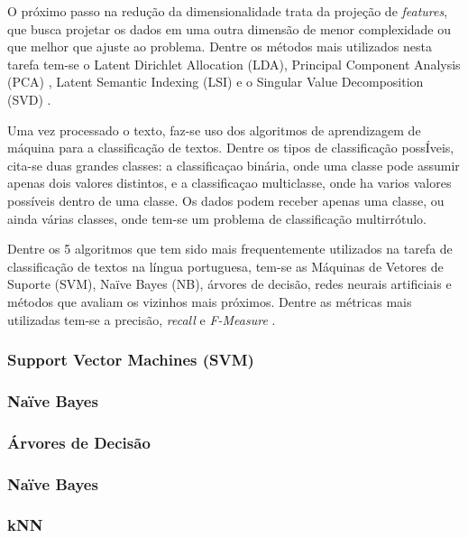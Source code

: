 

O próximo passo na redução da dimensionalidade trata da projeção de \textit{features}, que busca projetar os dados em uma outra dimensão de menor complexidade ou que melhor que ajuste ao problema. Dentre os métodos mais utilizados nesta tarefa tem-se o Latent Dirichlet Allocation (LDA), Principal Component Analysis (PCA) , Latent Semantic Indexing (LSI)  e o Singular Value Decomposition (SVD) . 

Uma vez processado o texto, faz-se uso dos algoritmos de aprendizagem de máquina para a classificação de textos. Dentre os tipos de classificação possÍveis, cita-se duas grandes classes: a classificaçao binária, onde uma classe pode assumir apenas dois valores distintos, e a classificaçao multiclasse, onde ha varios valores possíveis dentro de uma classe. Os dados podem receber apenas uma classe, ou ainda várias classes, onde tem-se um problema de classificação multirrótulo. 

Dentre os 5 algoritmos que tem sido mais frequentemente utilizados na tarefa de classificação de textos na língua portuguesa, tem-se as Máquinas de Vetores de Suporte (SVM), Naïve Bayes (NB), árvores de decisão, redes neurais artificiais e métodos que avaliam os vizinhos mais próximos. Dentre as métricas mais  utilizadas tem-se a precisão, \textit{recall} e \textit{F-Measure} \cite{reviewportugues}.

\subsubsection{Support Vector Machines (SVM)}
\subsubsection{Naïve Bayes}
\subsubsection{Árvores de Decisão}
\subsubsection{Naïve Bayes}
\subsubsection{kNN}

